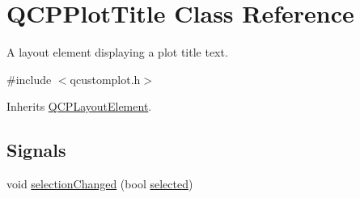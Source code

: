 \hypertarget{class_q_c_p_plot_title}{\section{Q\-C\-P\-Plot\-Title Class Reference}
\label{class_q_c_p_plot_title}
}


A layout element displaying a plot title text.  




{\ttfamily \#include $<$qcustomplot.\-h$>$}



Inherits \hyperlink{class_q_c_p_layout_element}{Q\-C\-P\-Layout\-Element}.

\subsection*{Signals}
\begin{DoxyCompactItemize}
\item 
void \hyperlink{class_q_c_p_plot_title_a3a01ede2da3b0b5eda33aa5274cc3523}{selection\-Changed} (bool \hyperlink{class_q_c_p_plot_title_a9771f3a4bca026484d7c8b5d953b5e82}{selected})
\end{DoxyCompactItemize}
